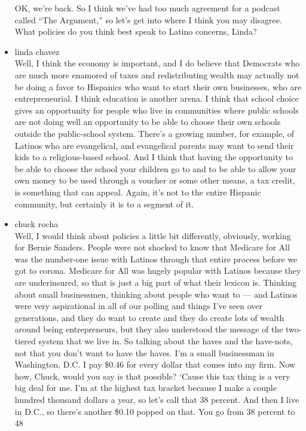 \begin{itemize}
  OK, we're back. So I think we've had too much agreement for a podcast
  called ``The Argument,'' so let's get into where I think you may
  disagree. What policies do you think best speak to Latino concerns,
  Linda?
\item
  linda chavez\\
  Well, I think the economy is important, and I do believe that
  Democrats who are much more enamored of taxes and redistributing
  wealth may actually not be doing a favor to Hispanics who want to
  start their own businesses, who are entrepreneurial. I think education
  is another arena. I think that school choice gives an opportunity for
  people who live in communities where public schools are not doing well
  an opportunity to be able to choose their own schools outside the
  public-school system. There's a growing number, for example, of
  Latinos who are evangelical, and evangelical parents may want to send
  their kids to a religious-based school. And I think that having the
  opportunity to be able to choose the school your children go to and to
  be able to allow your own money to be used through a voucher or some
  other means, a tax credit, is something that can appeal. Again, it's
  not to the entire Hispanic community, but certainly it is to a segment
  of it.
\item
  chuck rocha\\
  Well, I would think about policies a little bit differently,
  obviously, working for Bernie Sanders. People were not shocked to know
  that Medicare for All was the number-one issue with Latinos through
  that entire process before we got to corona. Medicare for All was
  hugely popular with Latinos because they are underinsured, so that is
  just a big part of what their lexicon is. Thinking about small
  businessmen, thinking about people who want to --- and Latinos were
  very aspirational in all of our polling and things I've seen over
  generations, and they do want to create and they do create lots of
  wealth around being entrepreneurs, but they also understood the
  message of the two-tiered system that we live in. So talking about the
  haves and the have-nots, not that you don't want to have the haves.
  I'm a small businessman in Washington, D.C. I pay \$0.46 for every
  dollar that comes into my firm. Now how, Chuck, would you say is that
  possible? `Cause this tax thing is a very big deal for me. I'm at the
  highest tax bracket because I make a couple hundred thousand dollars a
  year, so let's call that 38 percent. And then I live in D.C., so
  there's another \$0.10 popped on that. You go from 38 percent to 48

\end{itemize}
